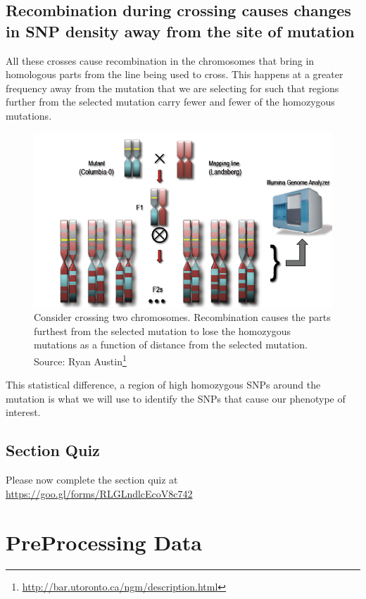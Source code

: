 \documentclass[12pt,]{book}
\let\rmarkdownfootnote\footnote%
\def\footnote{\protect\rmarkdownfootnote}
\renewcommand{\href}[2]{#2\footnote{\url{#1}}}
\begin{document}
\section{Recombination during crossing causes changes in SNP density
away from the site of
mutation}\label{recombination-during-crossing-causes-changes-in-snp-density-away-from-the-site-of-mutation}

All these crosses cause recombination in the chromosomes that bring in
homologous parts from the line being used to cross. This happens at a
greater frequency away from the mutation that we are selecting for such
that regions further from the selected mutation carry fewer and fewer of
the homozygous mutations.






\begin{figure}
\includegraphics[width=4.58in]{assets/ngm} \caption{Consider crossing two chromosomes. Recombination causes
the parts furthest from the selected mutation to lose the homozygous
mutations as a function of distance from the selected mutation. Source:
\href{http://bar.utoronto.ca/ngm/description.html}{Ryan Austin}}\label{fig:ngm}
\end{figure}

This statistical difference, a region of high homozygous SNPs around the
mutation is what we will use to identify the SNPs that cause our
phenotype of interest.

\section{Section Quiz}\label{section-quiz}

Please now complete the section quiz at
\url{https://goo.gl/forms/RLGLndlcEcoV8c742}

\chapter{PreProcessing Data}\label{preprocessing-data}
\end{document}

